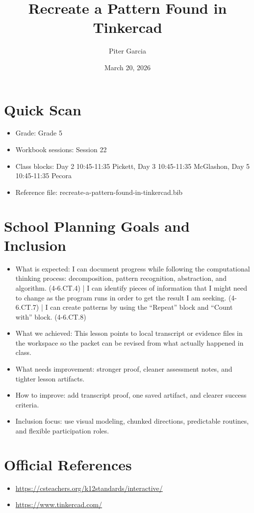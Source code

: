 \documentclass[11pt]{article}
\title{Recreate a Pattern Found in Tinkercad}
\author{Piter Garcia}
\date{March 20, 2026}
\begin{document}
    \maketitle
    \section*{Quick Scan}
    \begin{itemize}[leftmargin=*]
    \item Grade: Grade 5
    \item Workbook sessions: Session 22
    \item Class blocks: Day 2 10:45-11:35 Pickett, Day 3 10:45-11:35 McGlashon, Day 5 10:45-11:35 Pecora
    \item Reference file: recreate-a-pattern-found-in-tinkercad.bib
    \end{itemize}
    \section*{School Planning Goals and Inclusion}
    \begin{itemize}[leftmargin=*]
    \item What is expected: I can document progress while following the computational thinking process: decomposition, pattern recognition, abstraction, and algorithm. (4-6.CT.4) | I can identify pieces of information that I might need to change as the program runs in order to get the result I am seeking. (4-6.CT.7) | I can create patterns by using the “Repeat” block and “Count with” block. (4-6.CT.8)
    \item What we achieved: This lesson points to local transcript or evidence files in the workspace so the packet can be revised from what actually happened in class.
    \item What needs improvement: stronger proof, cleaner assessment notes, and tighter lesson artifacts.
    \item How to improve: add transcript proof, one saved artifact, and clearer success criteria.
    \item Inclusion focus: use visual modeling, chunked directions, predictable routines, and flexible participation roles.
    \end{itemize}
    \section*{Official References}
    \begin{itemize}[leftmargin=*]
    \item \url{https://csteachers.org/k12standards/interactive/}
\item \url{https://www.tinkercad.com/}

    \end{itemize}
    
\end{document}
